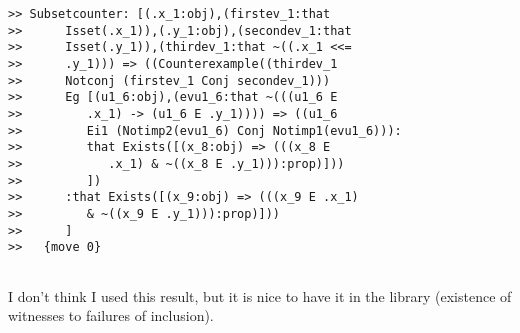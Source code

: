 \documentclass[12pt]{article}
\begin{document}
\begin{verbatim}
>> Subsetcounter: [(.x_1:obj),(firstev_1:that
>>      Isset(.x_1)),(.y_1:obj),(secondev_1:that
>>      Isset(.y_1)),(thirdev_1:that ~((.x_1 <<=
>>      .y_1))) => ((Counterexample((thirdev_1
>>      Notconj (firstev_1 Conj secondev_1)))
>>      Eg [(u1_6:obj),(evu1_6:that ~(((u1_6 E
>>         .x_1) -> (u1_6 E .y_1)))) => ((u1_6
>>         Ei1 (Notimp2(evu1_6) Conj Notimp1(evu1_6))):
>>         that Exists([(x_8:obj) => (((x_8 E
>>            .x_1) & ~((x_8 E .y_1))):prop)]))
>>         ])
>>      :that Exists([(x_9:obj) => (((x_9 E .x_1)
>>         & ~((x_9 E .y_1))):prop)]))
>>      ]
>>   {move 0}


\end{verbatim}

I don't think I used this result, but it is nice to have it in the library (existence of witnesses to failures of inclusion).
\end{document}
